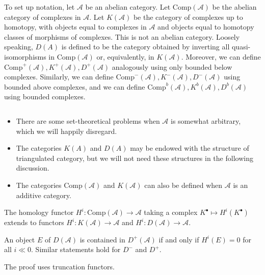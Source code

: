 To set up notation, let $\mathcal{A}$ be an abelian category. Let 
$\text{Comp}(\mathcal{A})$ be the abelian category of complexes in 
$\mathcal{A}$.  Let $K(\mathcal{A})$ be the category of complexes up to 
homotopy, with objects equal to complexes in $\mathcal{A}$ and objects equal to 
homotopy classes of morphisms of complexes. This is not an abelian category. 
Loosely speaking, $D(A)$ is defined to be the category obtained by inverting 
all quasi-isomorphisms in $\text{Comp}(\mathcal{A})$ or, equivalently, in 
$K(\mathcal{A})$.  Moreover, we can define $\text{Comp}^+(\mathcal{A}), 
K^+(\mathcal{A}), D^+(\mathcal{A})$ analogously using only bounded below 
complexes.  Similarly, we can define $\text{Comp}^-(\mathcal{A}), 
K^-(\mathcal{A}), D^-(\mathcal{A})$ using bounded above complexes, and we can 
define $\text{Comp}^b(\mathcal{A}), K^b(\mathcal{A}), D^b(\mathcal{A})$ using 
bounded complexes.

\begin{remark} $ $
\begin{itemize}
\item
There are some set-theoretical problems when $\mathcal{A}$ is somewhat 
arbitrary, which we will happily disregard.
\item
The categories $K(A)$ and $D(A)$ may be endowed with the structure of 
triangulated category, but we will not need these structures in the following 
discussion. 
\item
The categories $\text{Comp}(\mathcal{A})$ and $K(\mathcal{A})$ can also be 
defined when $\mathcal{A}$ is an additive category.
\end{itemize}
\end{remark}

The homology functor $H^i: \text{Comp}(\mathcal{A}) \to \mathcal{A}$ taking a 
complex $K^\bullet \mapsto H^i(K^\bullet)$ extends to functors $H^i: 
K(\mathcal{A}) \to \mathcal{A}$ and $H^i: D(\mathcal{A}) \to \mathcal{A}$.

\begin{lemma}
An object $E$ of $D(\mathcal{A})$ is contained in $D^+(\mathcal{A})$ if and 
only if $H^i(E) =0 $ for all $i \ll 0$.  Similar statements hold for $D^-$ and 
$D^+$.
\end{lemma}

The proof uses truncation functors.

